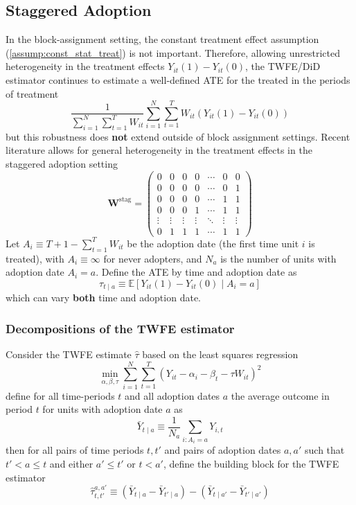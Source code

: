 \documentclass[twoside]{article}
\begin{document}
\subsection{Staggered Adoption}
In the block-assignment setting, the constant treatment effect assumption (\ref{assump:const_stat_treat}) is not important. Therefore, allowing unrestricted heterogeneity in the treatment effects $Y_{it}(1)-Y_{it}(0)$, the TWFE/DiD estimator continues to estimate a well-defined ATE for the treated in the periods of treatment 
\begin{equation*}
    \frac{1}{\sum^N_{i=1}\sum^T_{t=1}W_{it}} \sum^N_{i=1}\sum^T_{t=1}W_{it} \left(Y_{it}(1)-Y_{it}(0)\right)
\end{equation*}
but this robustness does \textbf{not} extend outside of block assignment settings. Recent literature allows for general heterogeneity in the treatment effects in the staggered adoption setting
\begin{equation*}
    \mathbf{W}^{\text{stag}} = \begin{pmatrix}
        0&0&0&0&\cdots& 0 &0\\
        0&0&0&0&\cdots& 0 &1\\
        0&0&0&0&\cdots& 1 &1\\
        0&0&0&1&\cdots&1 &1\\
        \vdots &\vdots & \vdots & \vdots & \ddots &\vdots & \vdots \\
        0&1&1&1&\cdots &1 & 1
    \end{pmatrix}
\end{equation*}
Let $A_i\equiv T+1-\sum^T_{t=1}W_{it}$ be the adoption date (the first time unit $i$ is treated), with $A_i\equiv \infty$ for never adopters, and $N_a$ is the number of units with adoption date $A_i=a$.
Define the ATE by time and adoption date as 
\begin{equation*}
    \tau_{t\mid a} \equiv \mathbb{E} \left[Y_{it}(1)-Y_{it}(0)\mid A_i=a \right]
\end{equation*}
which can vary \textbf{both} time and adoption date. 

\subsubsection{Decompositions of the TWFE estimator}
Consider the TWFE estimate $\hat{\tau}$ based on the least squares regression $$ \min_{\alpha,\beta,\tau}\sum^N_{i=1}\sum^T_{t=1}\left(Y_{it}-\alpha_i-\beta_t-\tau W_{it}\right)^2 $$
define for all time-periods $t$ and all adoption dates $a$ the average outcome in period $t$ for units with adoption date $a$ as $$ \bar{Y}_{t\mid a} \equiv \frac{1}{N_a}\sum_{i:A_i=a}Y_{i,t} $$
then for all pairs of time periods $t,t'$ and pairs of adoption dates $a,a'$ such that $t'<a\leq t$ and either $a'\leq t'$ or $t < a'$, define the building block for the TWFE estimator
\begin{equation*}
    \hat{\tau}^{a,a'}_{t,t'} \equiv \left( \bar{Y}_{t\mid a}-\bar{Y}_{t'\mid a} \right) - \left( \bar{Y}_{t\mid a'}-\bar{Y}_{t'\mid a'} \right)
\end{equation*}
\end{document}
